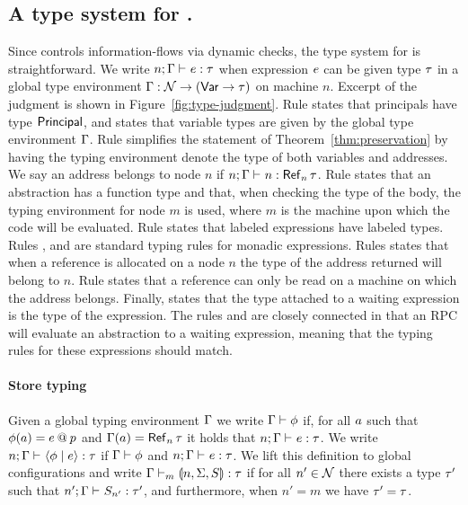 \subsection{A type system for \lang.}
Since \lang{} controls information-flows via dynamic checks, the type system for \lang{} is straightforward. We write $\hastype{n; \tenv}{\expr}{\type}$ when expression $e$ can be given type $\tau$ in a global type environment $\Gamma: \mathcal{N} \rightarrow (\mathsf{Var} \to \tau)$ on machine $n$. Excerpt of the judgment is shown in Figure~\ref{fig:type-judgment}. Rule  states that principals have type $\mathsf{Principal}$, and  states that variable types are given by the global type environment $\Gamma$. Rule  simplifies the statement of Theorem~\ref{thm:preservation} by having the typing environment denote the type of both variables and addresses. We say an address belongs to node $n$ if $\hastype{n; \tenv}{n}{\reftype[n]{\type}}$. Rule  states that an abstraction has a function type and that, when checking the type of the body, the typing environment for node $m$ is used, where $m$ is the machine upon which the code will be evaluated. Rule  states that labeled expressions have labeled types. Rules ,  and  are standard typing rules for monadic expressions. Rules  states that when a reference is allocated on a node $n$ the type of the address returned will belong to $n$. Rule  states that a reference can only be read on a machine on which the address belongs. Finally,  states that the type attached to a waiting expression is the type of the expression. The rules  and  are closely connected in that an RPC will evaluate an abstraction to a waiting expression, meaning that the typing rules for these expressions should match.

\paragraph{Store typing}
Given a global typing environment $\Gamma$ we write $\Gamma \vdash \phi$ if, for all $a$ such that $\phi(a) = e \mathbin{@} p$ and $\tenv(\addr) = \reftype[n]{\type}$ it holds that $\hastype{n; \tenv}{\expr}{\type}$. We write $\hastype{n; \tenv}{\config{\store}{\expr}}{\type}$ if $\Gamma \vdash \phi$ and $\hastype{n; \tenv}{\expr}{\type}$. We lift this definition to global configurations and write $\hastype[m]{\tenv}{\gconfig{n}{\env}{S}}{\type}$ if for all $n' \in \mathcal{N}$ there exists a type $\tau'$ such that $\hastype{n'; \tenv}{S_{n'}}{\type'}$, and furthermore, when $n' = m$ we have $\tau' = \tau$.

